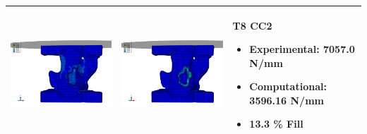 \documentclass[11pt,a4paper]{article}
\begin{document}
\begin{landscape}
\begin{longtable}{|m{11cm}|m{11cm}|m{4cm}|}
\includegraphics[width=10cm]{images/T8_CC2_postVP_Interface_ABAQUS_All_Side_Stress.png}   & \includegraphics[width=10cm]{images/T8_CC2_postVP_Interface_ABAQUS_All_Side_Strain.png}   & T8 CC2  \begin{itemize} \item Experimental: 	7057.0	N/mm \item Computational:	3596.16 N/mm \item 13.3 \% Fill \end{itemize} \\ \hline 

\end{longtable}
\end{landscape}
\end{document}
